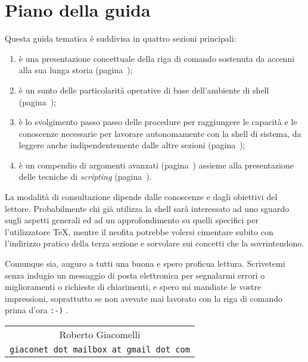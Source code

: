 
%
%
%
\chapter{Piano della guida}

Questa guida tematica è suddivisa in quattro sezioni principali:
\begin{enumerate}
\item è una presentazione concettuale della riga di comando sostenuta da accenni
alla sua lunga storia (pagina~\pageref{chapConsole});

\item è un sunto delle particolarità operative di base dell'ambiente di shell
(pagina~\pageref{chapShell});

\item è lo svolgimento passo passo delle procedure per raggiungere le capacità e
le conoscenze necessarie per lavorare autonomamente con la shell di sistema, da
leggere anche indipendentemente dalle altre sezioni (pagina~\pageref{chapEser});

\item è un compendio di argomenti avanzati (pagina~\pageref{chapAvanz})
assieme alla presentazione delle tecniche di \emph{scripting}
(pagina~\pageref{chapScripting}).
\end{enumerate}

La modalità di consultazione dipende dalle conoscenze e dagli obiettivi del
lettore. Probabilmente chi già utilizza la shell sarà interessato ad uno sguardo
sugli aspetti generali ed ad un approfondimento su quelli specifici per
l'utilizzatore \TeX, mentre il neofita potrebbe volersi cimentare subito con
l'indirizzo pratico della terza sezione e sorvolare sui concetti che la
sovrintendono.

Comunque sia, auguro a tutti una buona e spero proficua lettura. Scrivetemi
senza indugio un messaggio di posta elettronica per segnalarmi errori o
miglioramenti o richieste di chiarimenti, e spero mi mandiate le vostre
impressioni, soprattutto se non avevate mai lavorato con la riga di comando
prima d'ora \texttt{:-)} .

\medskip
\hfill\begin{tabular}{c}
Roberto Giacomelli\\
\texttt{giaconet dot mailbox at gmail dot com}\\
\end{tabular}
